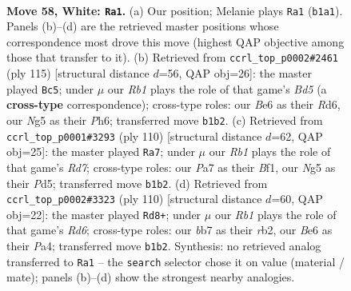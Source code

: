 \documentclass[11pt]{article}
\begin{document}
\clearpage

\begin{figure}[p]\centering
\begin{subfigure}{0.46\textwidth}\centering
\resizebox{\linewidth}{!}{%
\newchessgame
\chessboard[
  setfen={8/Pb1n2k1/4B3/5pN1/1pN2P2/1Pn3P1/5K1P/1R6 w - - 1 58},
  showmover=false,
  pgfstyle=straightmove, color=movearrow, markmove={b1-a1}
]}
\caption{}
\end{subfigure}\hfill
\begin{subfigure}{0.46\textwidth}\centering
\resizebox{\linewidth}{!}{%
\newchessgame
\chessboard[
  setfen={4k3/5pp1/3rn2p/3N3P/3bBP2/6PK/R7/8 b - - 24 58},
  showmover=false,
  pgfstyle=straightmove, color=movearrow, markmove={d4-c5}
]}
\caption{}
\end{subfigure}
\\[4pt]
\begin{subfigure}{0.46\textwidth}\centering
\resizebox{\linewidth}{!}{%
\newchessgame
\chessboard[
  setfen={7r/3R3P/1r1p1k2/3Pn3/4PNp1/6P1/5P2/5BK1 w - - 3 56},
  showmover=false,
  pgfstyle=straightmove, color=movearrow, markmove={d7-a7}
]}
\caption{}
\end{subfigure}\hfill
\begin{subfigure}{0.46\textwidth}\centering
\resizebox{\linewidth}{!}{%
\newchessgame
\chessboard[
  setfen={6k1/8/3R1Bp1/1Pp4p/Pnn4P/2N3P1/1r6/4K3 w - - 5 56},
  showmover=false,
  pgfstyle=straightmove, color=movearrow, markmove={d6-d8}
]}
\caption{}
\end{subfigure}
\caption{\textbf{Move 58, White: \texttt{Ra1}.} (a) Our position; Melanie plays \texttt{Ra1} (\texttt{b1a1}). Panels (b)--(d) are the retrieved master positions whose correspondence most drove this move (highest QAP objective among those that transfer to it). (b) Retrieved from \texttt{ccrl\_top\_p0002\#2461} (ply 115) [structural distance $d$=56, QAP obj=26]: the master played \texttt{Bc5}; under $\mu$ our \emph{Rb1} plays the role of that game's \emph{Bd5} (a \textbf{cross-type} correspondence); cross-type roles: our \emph{B}e6 as their \emph{R}d6, our \emph{N}g5 as their \emph{P}h6; transferred move \texttt{b1b2}. (c) Retrieved from \texttt{ccrl\_top\_p0001\#3293} (ply 110) [structural distance $d$=62, QAP obj=25]: the master played \texttt{Ra7}; under $\mu$ our \emph{Rb1} plays the role of that game's \emph{Rd7}; cross-type roles: our \emph{P}a7 as their \emph{B}f1, our \emph{N}g5 as their \emph{P}d5; transferred move \texttt{b1b2}. (d) Retrieved from \texttt{ccrl\_top\_p0002\#3323} (ply 110) [structural distance $d$=60, QAP obj=22]: the master played \texttt{Rd8+}; under $\mu$ our \emph{Rb1} plays the role of that game's \emph{Rd6}; cross-type roles: our \emph{b}b7 as their \emph{r}b2, our \emph{B}e6 as their \emph{P}a4; transferred move \texttt{b1b2}. Synthesis: no retrieved analog transferred to \texttt{Ra1} -- the \texttt{search} selector chose it on value (material / mate); panels (b)--(d) show the strongest nearby analogies.}
\label{fig:thought-m114}
\end{figure}
\end{document}

